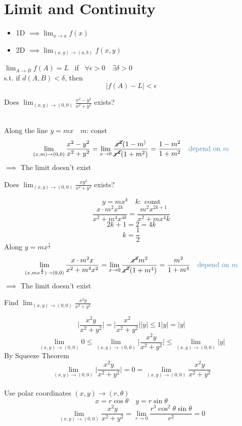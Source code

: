 \section{Limit and Continuity}
\begin{itemize}
\item 1D \(\implies \displaystyle \lim_{x \to a} f(x)\)
\item 2D \(\implies \displaystyle \lim_{(x, y) \to (a, b)} f(x, y)\)
\end{itemize}
\begin{defn}
\(\displaystyle \lim_{A \to B} f(A) = L\) \ if \ \(\forall \epsilon > 0 \quad \exists \delta > 0\)\\
s.t. if \(d(A, B) < \delta\), then 
\[|f(A) - L| < \epsilon\]
\end{defn}
\begin{eg}
Does \(\displaystyle \lim_{(x, y) \to (0, 0)} \frac{x^2 - y^2}{x^2 + y^2}\) exists? \quad {}

\soln \ \\
Along the line \(y = mx \quad m\): const\\
\[\displaystyle \lim_{(x, m) \to (0, 0)} \frac{x^2 - y^2}{x^2 + y^2} = \displaystyle \lim_{x \to 0} \frac{\cancel{x^2} (1 - m^)}{\cancel{x^2} (1 + m^2)} = \displaystyle \frac{1 - m^2}{1 + m^2} \quad \tssteelblue{\text{depend on } m}\]
\(\implies\) The limit doesn't exist
\end{eg}
\begin{eg}
Does \(\displaystyle \lim_{(x, y) \to (0, 0)} \frac{xy^2}{x^2 + y^4}\) exists?

\soln
\[y = mx^k \quad k: \text{ const}\]
\[\displaystyle \frac{x \cdot m^2 x^{2k}}{x^2 + m^4x^{4k}} = \frac{m^2 x^{2k + 1}}{x^2 + mx^4k}\]
\[2k + 1 = 2 = 4k\]
\[k = \frac{1}{2}\]
Along \(y = mx^{\frac{1}{2}}\)
\[\displaystyle \lim_{(x, mx^{\frac{1}{2}}) \to (0, 0)} \frac{x \cdot m^2x}{x^2 + m^4x^2} = \lim_{x \to 0} \frac{\cancel{x^2} m^2}{\cancel{x^2}(1 + m^4)} = \frac{m^2}{1 + m^4} \quad \tssteelblue{\text{depend on }m}\]
\(\implies\) The limit doesn't exist
\end{eg}
\begin{eg}
Find \(\displaystyle \lim_{(x, y) \to (0, 0)} \frac{x^2y}{x^2 + y^2}\)

\[\displaystyle \Big| \frac{x^2y}{x^2 + y^2} \Big| = \Big| \frac{x^2}{x^2 + y^2} \Big| \Big|y\Big| \leq 1|y| = |y|\]
\[\displaystyle \lim_{(x, y) \to (0, 0)} 0 \leq \lim_{(x, y) \to (0, 0)} \Big| \frac{x^2y}{x^2 + y^2} \Big| \leq \lim_{(x, y) \to (0, 0)} |y|\]
By Squeeze Theorem
\[\displaystyle \lim_{(x, y) \to (0, 0)} \Big| \frac{x^2y}{x^2 + y^2} \Big| = 0 = \lim_{(x, y) \to (0, 0)} \frac{x^2y}{x^2 + y^2}\]
\\
Use polar coordinates \((x, y) \to (r, \theta)\)
\[x = r\cos \theta \quad y = r\sin \theta\]
\[\displaystyle \lim_{(x, y) \to (0, 0)} \frac{x^2y}{x^2 + y^2} = \lim_{r \to 0} \frac{r^3 \cos^2 \theta \sin \theta}{r^2} = 0\]
\end{eg}
